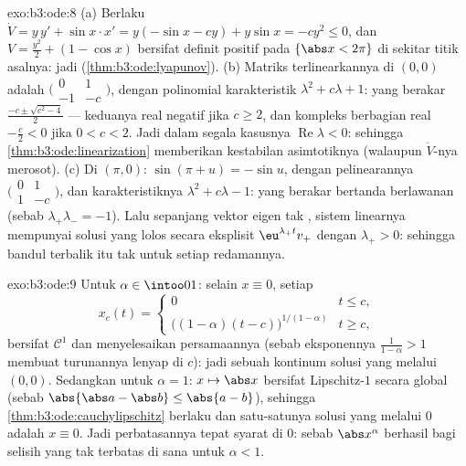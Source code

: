 \begin{solution}{exo:b3:ode:8}
(a) Berlaku $\dot V = y\,y' + \sin x\cdot x' = y(-\sin x - cy) +
y\sin x = -cy^2 \leq 0$, dan $V = \frac{y^2}2 + (1 - \cos x)$
bersifat definit positif pada $\{\abs x < 2\pi\}$ di sekitar
titik asalnya: jadi  (\cref{thm:b3:ode:lyapunov}).
(b) Matriks terlinearkannya di $(0,0)$ adalah
$\bigl(\begin{smallmatrix}0 & 1\\ -1 &
-c\end{smallmatrix}\bigr)$, dengan polinomial karakteristik
$\lambda^2 + c\lambda + 1$: yang berakar $\frac{-c \pm \sqrt{c^2 -
4}}2$ --- keduanya real negatif jika $c \geq 2$, dan kompleks berbagian
real $-\frac c2 < 0$ jika $0 < c < 2$. Jadi dalam segala kasusnya
$\operatorname{Re}\lambda < 0$: sehingga
\cref{thm:b3:ode:linearization} memberikan kestabilan asimtotiknya
(walaupun $\dot V$-nya merosot).
(c) Di $(\pi, 0)$: $\sin(\pi + u) = -\sin u$, dengan pelinearannya
$\bigl(\begin{smallmatrix}0&1\\1&-c\end{smallmatrix}\bigr)$,
dan karakteristiknya $\lambda^2 + c\lambda - 1$: yang berakar bertanda
berlawanan (sebab $\lambda_+\lambda_- = -1$). Lalu sepanjang vektor eigen
tak , sistem linearnya mempunyai solusi yang lolos secara
eksplisit $\eu^{\lambda_+t}v_+$ dengan $\lambda_+ > 0$: sehingga
bandul terbalik itu tak  untuk setiap redamannya.
\end{solution}

\begin{solution}{exo:b3:ode:9}
Untuk $\alpha \in \intoo01$: selain $x \equiv 0$, setiap
\[
x_c(t) = \begin{cases}0 & t \leq c,\\
\bigl((1-\alpha)(t - c)\bigr)^{1/(1-\alpha)} & t \geq c,
\end{cases}
\]
bersifat $\mathcal C^1$ dan menyelesaikan persamaannya (sebab eksponennya
$\frac1{1-\alpha} > 1$ membuat turunannya lenyap di $c$): jadi sebuah
kontinum solusi yang melalui $(0,0)$. Sedangkan untuk $\alpha = 1$: $x
\mapsto \abs x$ bersifat Lipschitz-$1$ secara global
(sebab $\abs{\abs a - \abs b} \leq \abs{a - b}$), sehingga
\cref{thm:b3:ode:cauchylipschitz} berlaku dan satu-satunya
solusi yang melalui $0$ adalah $x \equiv 0$. Jadi perbatasannya tepat
syarat  di $0$: sebab $\abs x^\alpha$ berhasil bagi
selisih yang tak terbatas di sana untuk $\alpha < 1$.
\end{solution}

